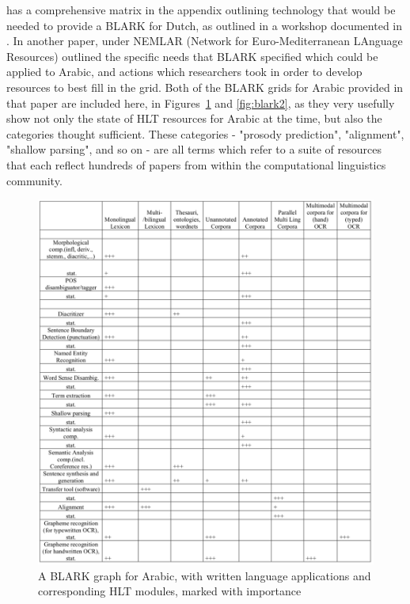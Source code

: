 \citet{krauwer2003basic} has a comprehensive matrix in the appendix outlining technology that would be needed to provide a BLARK for Dutch, as outlined in a workshop documented in \citet{binnenpoorte2002towards}. In another paper, \citet{maegaard2006blark} under NEMLAR (Network  for  Euro-Mediterranean  LAnguage  Resources) outlined the specific needs that BLARK specified which could be applied to Arabic, and actions which researchers took in order to develop resources to best fill in the grid. Both of the BLARK grids for Arabic provided in that paper are included here, in Figures~\ref{fig:blark1} and \ref{fig:blark2}, as they very usefully show not only the state of HLT resources for Arabic at the time, but also the categories thought sufficient. These categories - "prosody prediction", "alignment", "shallow parsing", and so on - are all terms which refer to a suite of resources that each reflect hundreds of papers from within the computational linguistics community.

\begin{figure}
 \centering
 \includegraphics[width=1\textwidth]{img/blark1.png}
 \caption{A BLARK graph for Arabic, with written language applications and corresponding HLT modules, marked with importance \citep[775]{maegaard2006blark}}
 \label{fig:blark1}
\end{figure}

